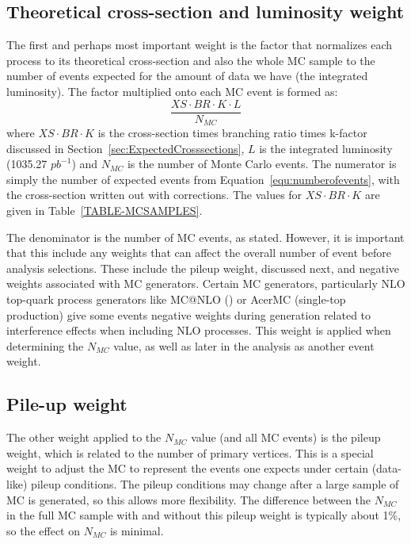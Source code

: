 \subsection{Theoretical cross-section and luminosity weight}
The first and perhaps most important weight is the factor that normalizes each process to its theoretical cross-section and also the whole MC sample to the number of events expected for the amount of data we have (the integrated luminosity).  The factor multiplied onto each MC event is formed as:
\begin{equation} \frac{XS \cdot BR \cdot K \cdot L}{N_{MC}} \end{equation}
where $XS \cdot BR \cdot K$ is the cross-section times branching ratio times k-factor discussed in Section~\ref{sec:ExpectedCrosssections}, $L$ is the integrated luminosity (1035.27 $pb^{-1}$) and $N_{MC}$ is the number of Monte Carlo events.  The numerator is simply the number of expected events from Equation~\ref{equ:numberofevents}, with the cross-section written out with corrections.  The values for $XS \cdot BR \cdot K$ are given in Table~\ref{TABLE-MCSAMPLES}.

The denominator is the number of MC events, as stated.  However, it is important that this include any weights that can affect the overall number of event before analysis selections.  These include the pileup weight, discussed next, and negative weights associated with MC generators.  Certain MC generators, particularly NLO top-quark process generators like {\sc MC@NLO} (\ttbar) or {\sc AcerMC} (single-top production) give some events negative weights during generation related to interference effects when including NLO processes.  This weight is applied when determining the $N_{MC}$ value, as well as later in the analysis as another event weight.  

\subsection{Pile-up weight}
The other weight applied to the $N_{MC}$ value (and all MC events) is the pileup weight, which is related to the number of primary vertices.  This is a special weight to adjust the MC to represent the events one expects under certain (data-like) pileup conditions.  The pileup conditions may change after a large sample of MC is generated, so this allows more flexibility.  The difference between the $N_{MC}$ in the full MC sample with and without this pileup weight is typically about 1\%, so the effect on $N_{MC}$ is minimal.

